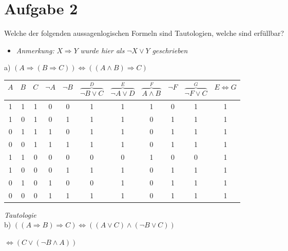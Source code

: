 \section*{Aufgabe 2}

Welche der folgenden aussagenlogischen Formeln sind Tautologien, welche sind erfüllbar?\\

\begin{itemize}[leftmargin=*]
\item \textit{Anmerkung:} $X \Rightarrow Y$ \textit{wurde hier als} $\lnot X \lor Y$ \textit{geschrieben}
\end{itemize}

a) $(A \Rightarrow (B \Rightarrow C)) \Leftrightarrow ((A \land B) \Rightarrow C)$\\

\begin{table}[h]
\centering
\begin{tabular}{c|c|c|c|c|c|c|c|c|c|c}
$A$ & $B$ & $C$ & $\lnot A$ & $\lnot B$ & $\overbrace{\lnot B \lor C}^{D}$ & $\overbrace{\lnot A \lor D}^{E}$ & $\overbrace{A \land B}^{F}$ & $\lnot F$ & $\overbrace{\lnot F \lor C}^{G}$ & $E \Leftrightarrow G$\\
\hline
1 & 1 & 1 & 0 & 0 & 1 & 1 & 1 & 0 & 1 & 1\\
1 & 0 & 1 & 0 & 1 & 1 & 1 & 0 & 1 & 1 & 1\\
0 & 1 & 1 & 1 & 0 & 1 & 1 & 0 & 1 & 1 & 1\\
0 & 0 & 1 & 1 & 1 & 1 & 1 & 0 & 1 & 1 & 1\\
1 & 1 & 0 & 0 & 0 & 0 & 0 & 1 & 0 & 0 & 1\\
1 & 0 & 0 & 0 & 1 & 1 & 1 & 0 & 1 & 1 & 1\\
0 & 1 & 0 & 1 & 0 & 0 & 1 & 0 & 1 & 1 & 1\\
0 & 0 & 0 & 1 & 1 & 1 & 1 & 0 & 1 & 1 & 1
\end{tabular}
\end{table}

\textit{Tautologie}\\

b) $((A \Rightarrow B) \Rightarrow C) \Leftrightarrow ((A \lor C) \land (\lnot B \lor C))$

\hspace{3.57cm}$\Leftrightarrow (C \lor (\lnot B \land A))$

